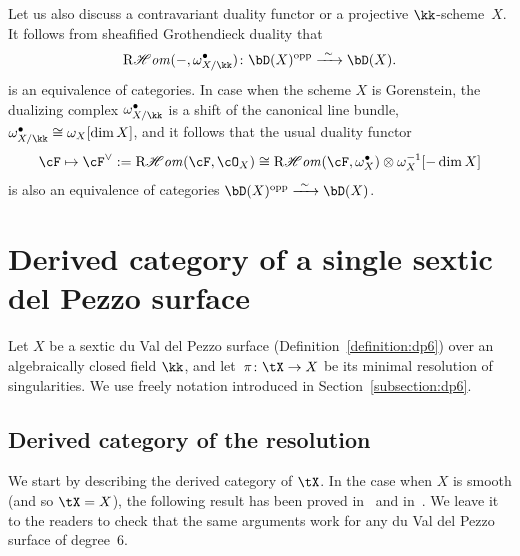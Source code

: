 \documentclass[11pt]{amsart}
\DeclareMathOperator{\RCHom}{\mathrm{R}\mathscr{H}\mathit{om}}
\theoremstyle{plain}
\theoremstyle{definition}
\theoremstyle{remark}
\begin{document}
Let us also discuss a contravariant duality functor or a projective $\kk$-scheme~$X$. 
It follows from sheafified Grothendieck duality that 
\begin{equation*}
\RCHom(-,\omega^\bullet_{X/\kk}) \colon \bD(X)^{\mathrm{opp}} \xrightarrow{\ \sim\ } \bD(X).
\end{equation*}
is an equivalence of categories.
In case when the scheme $X$ is Gorenstein, the dualizing complex $\omega^\bullet_{X/\kk}$ 
is a shift of the canonical line bundle, $\omega^\bullet_{X/\kk} \cong \omega_X[\dim X]$, 
and it follows that the usual duality functor
\begin{equation*}
\cF \mapsto \cF^\vee := \RCHom(\cF,\cO_X) \cong \RCHom(\cF,\omega_X^\bullet) \otimes \omega_X^{-1}[-\dim X]
\end{equation*}
is also an equivalence of categories $\bD(X)^{\mathrm{opp}} \xrightarrow{\ \sim\ } \bD(X)$.



\section{Derived category of a single sextic del Pezzo surface}
\label{section:dp6-single}

Let $X$ be a sextic du Val del Pezzo surface (Definition~\ref{definition:dp6}) over an algebraically closed field $\kk$, and let~$\pi \colon \tX \to X$ be its minimal resolution of singularities.
We use freely notation introduced in Section~\ref{subsection:dp6}.

\subsection{Derived category of the resolution}\label{subsection:derived-tx}

We start by describing the derived category of $\tX$.
In the case when $X$ is smooth (and so $\tX = X$), the following result has been proved in~\cite[Proposition~4.2(3)]{karpov-nogin}
and in~\cite[proof of Proposition~9.1]{auel2015semiorthogonal}.
We leave it to the readers to check that the same arguments work for any du Val del Pezzo surface of degree~6.
\end{document}

